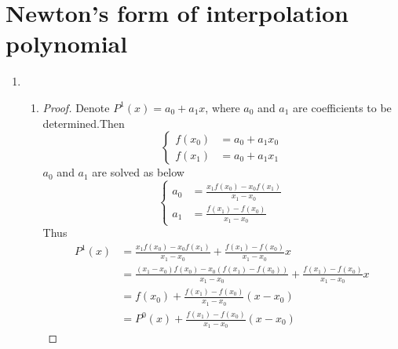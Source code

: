 \documentclass[paper=a4, fontsize=11pt]{scrartcl} %
\numberwithin{equation}{section} %
\numberwithin{figure}{section} %
\numberwithin{table}{section} %
\begin{document}
\section{Newton's form of interpolation polynomial}
	\begin{enumerate}
		\item 
			\begin{enumerate}
				\item
					\begin{proof}
						Denote $P^1(x) = a_0 + a_1 x$, where $a_0$ and $a_1$ are coefficients to be determined.Then
						\begin{equation}
							\left\{
							\begin{aligned}
								f(x_0) & = a_0 + a_1 x_0 \\
								f(x_1) & = a_0 + a_1 x_1
							\end{aligned}
							\right.
						\end{equation}
						$a_0$ and $a_1$ are solved as below
						\begin{equation}
							\left\{
							\begin{aligned}
								a_0 & = \frac{x_1 f(x_0) - x_0 f(x_1)}{x_1 - x_0}\\
								a_1 & = \frac{f(x_1)-f(x_0)}{x_1 - x_0}
							\end{aligned}
							\right.
						\end{equation}
						Thus
						\begin{equation}
							\begin{aligned}
								P^1(x) & = \frac{x_1 f(x_0) - x_0 f(x_1)}{x_1 - x_0} + \frac{f(x_1) - f(x_0)}{x_1 - x_0} x \\
									   & = \frac{(x_1 - x_0)f(x_0) - x_0 (f(x_1) - f(x_0))}{x_1 - x_0} + \frac{f(x_1) - f(x_0)}{x_1 - x_0}x \\
									   & = f(x_0) + \frac{f(x_1) - f(x_0)}{x_1 - x_0} (x-x_0)\\
									   & = P^0(x) + \frac{f(x_1) - f(x_0)}{x_1 - x_0} (x-x_0)
							\end{aligned}
						\end{equation}
					\end{proof}
					 

\end{enumerate}
\end{enumerate}
\end{document}
